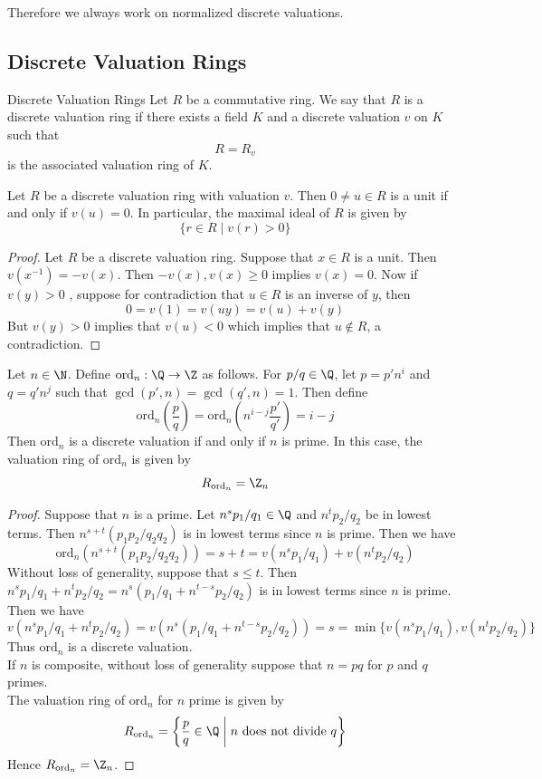 \documentclass[a4paper]{article}
\begin{document}
Therefore we always work on normalized discrete valuations. 

\subsection{Discrete Valuation Rings}
\begin{defn}{Discrete Valuation Rings}{} Let $R$ be a commutative ring. We say that $R$ is a discrete valuation ring if there exists a field $K$ and a discrete valuation $v$ on $K$ such that $$R=R_v$$ is the associated valuation ring of $K$. 
\end{defn}

\begin{lmm}{}{} Let $R$ be a discrete valuation ring with valuation $v$. Then $0\neq u\in R$ is a unit if and only if $v(u)=0$. In particular, the maximal ideal of $R$ is given by $$\{r\in R\;|\;v(r)>0\}$$ 
\begin{proof}
Let $R$ be a discrete valuation ring. Suppose that $x\in R$ is a unit. Then $v(x^{-1})=-v(x)$. Then $-v(x),v(x)\geq 0$ implies $v(x)=0$. Now if $v(y)>0$ , suppose for contradiction that $u\in R$ is an inverse of $y$, then $$0=v(1)=v(uy)=v(u)+v(y)$$ But $v(y)>0$ implies that $v(u)<0$ which implies that $u\notin R$, a contradiction. 
\end{proof}
\end{lmm}

\begin{eg}{}{} Let $n\in\N$. Define $\text{ord}_n:\Q\to\Z$ as follows. For $p/q\in\Q$, let $p=p'n^i$ and $q=q'n^j$ such that $\gcd(p',n)=\gcd(q',n)=1$. Then define $$\text{ord}_n\left(\frac{p}{q}\right)=\text{ord}_n\left(n^{i-j}\frac{p'}{q'}\right)=i-j$$ Then $\text{ord}_n$ is a discrete valuation if and only if $n$ is prime. In this case, the valuation ring of $\text{ord}_n$ is given by $$R_{\text{ord}_n}=\Z_n$$ 
\begin{proof}
Suppose that $n$ is a prime. Let $n^sp_1/q_1\in\Q$ and $n^tp_2/q_2$ be in lowest terms. Then $n^{s+t}(p_1p_2/q_2q_2)$ is in lowest terms since $n$ is prime. Then we have $$\text{ord}_n(n^{s+t}(p_1p_2/q_2q_2))=s+t=v(n^sp_1/q_1)+v(n^tp_2/q_2)$$ Without loss of generality, suppose that $s\leq t$. Then $n^sp_1/q_1+n^tp_2/q_2=n^s(p_1/q_1+n^{t-s}p_2/q_2)$ is in lowest terms since $n$ is prime. Then we have $$v(n^sp_1/q_1+n^tp_2/q_2)=v(n^s(p_1/q_1+n^{t-s}p_2/q_2))=s=\min\{v(n^sp_1/q_1), v(n^tp_2/q_2)\}$$ Thus $\text{ord}_n$ is a discrete valuation. \\

If $n$ is composite, without loss of generality suppose that $n=pq$ for $p$ and $q$ primes. \\

The valuation ring of $\text{ord}_n$ for $n$ prime is given by $$R_{\text{ord}_n}=\left\{\frac{p}{q}\in\Q\;\bigg{|}\;n\text{ does not divide }q\right\}$$ Hence $R_{\text{ord}_n}=\Z_n$. 
\end{proof}
\end{eg}
\end{document}
